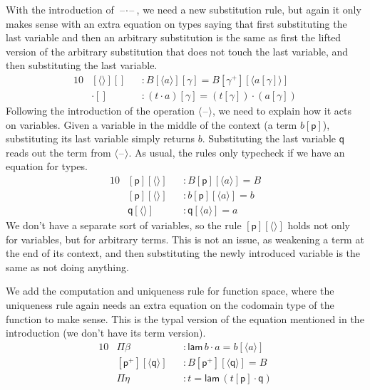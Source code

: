 \documentclass[sigplan,10pt,anonymous,review]{acmart}\settopmatter{printfolios=true,printccs=false,printacmref=false}
\newcommand{\p}{\mathsf{p}}
\newcommand{\q}{\mathsf{q}}
\newcommand{\lam}{\mathsf{lam}}
\newcommand{\blank}{\mathord{\hspace{1pt}\text{--}\hspace{1pt}}} %
\begin{document}
With the introduction of $\blank\cdot\blank$, we need a new
substitution rule, but again it only makes sense with an extra
equation on types saying that first substituting the last variable and
then an arbitrary substitution is the same as first the lifted version
of the arbitrary substitution that does not touch the last variable,
and then substituting the last variable.
\begin{alignat*}{10}
& [\langle\rangle][] && : B[\langle a\rangle][\gamma] = B[\gamma^+][\langle a[\gamma]\rangle] \\
& {\cdot}[] && : (t\cdot a)[\gamma] = (t[\gamma])\cdot(a[\gamma])
\end{alignat*}
Following the introduction of the operation $\langle\blank\rangle$, we
need to explain how it acts on variables. Given a variable in the
middle of the context (a term $b[\p]$), substituting its last variable
simply returns $b$. Substituting the last variable $\q$ reads out the
term from $\langle\blank\rangle$. As usual, the rules only typecheck
if we have an equation for types.
\begin{alignat*}{10}
& [\p][\langle\rangle] && : B[\p][\langle a\rangle] = B \\
& [\p][\langle\rangle] && : b[\p ][\langle a\rangle] = b \\
& \q[\langle\rangle] && : \q[\langle a\rangle] = a
\end{alignat*}
We don't have a separate sort of variables, so the rule
$[\p][\langle\rangle]$ holds not only for variables, but for arbitrary
terms. This is not an issue, as weakening a term at the end of its
context, and then substituting the newly introduced variable is the
same as not doing anything.

We add the computation and uniqueness rule for function space, where
the uniqueness rule again needs an extra equation on the codomain type
of the function to make sense. This is the typal version of the
equation mentioned in the introduction (we don't have its term version).
\begin{alignat*}{10}
& \Pi\beta && : \lam\,b\cdot a = b[\langle a\rangle] \\
& [\p^+][\langle\q\rangle] && : B[\p^+][\langle\q\rangle] = B \\
& \Pi\eta && : t = \lam\,(t[\p]\cdot\q)
\end{alignat*}
\end{document}
